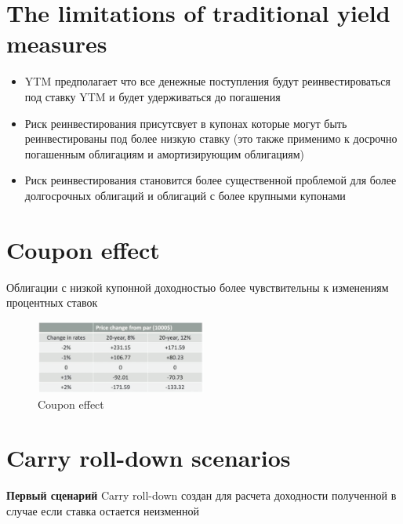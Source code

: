 \documentclass{article}
\begin{document}
 \section{The limitations of traditional yield measures}
 \begin{itemize}
     \item YTM предполагает что все денежные поступления будут реинвестироваться под ставку YTM и будет удерживаться до погашения
     \item Риск реинвестирования присутсвует в купонах которые могут быть реинвестированы под более низкую ставку (это также применимо к досрочно погашенным облигациям и амортизирующим облигациям)
     \item Риск реинвестирования становится более существенной проблемой для более долгосрочных облигаций и облигаций с более крупными купонами
 \end{itemize}
 \section{Coupon effect}
 Облигации с низкой купонной доходностью более чувствительны к изменениям процентных ставок
 \begin{figure}[h]
\centering
\includegraphics[width=0.5\textwidth]{coupon.png}
\caption{Coupon effect}
\label{loadings}
\end{figure}
\section{Carry roll-down scenarios}
\textbf{Первый сценарий} Carry roll-down создан для расчета доходности полученной в случае если ставка остается неизменной\\
\end{document}
